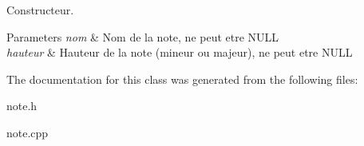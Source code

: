 Constructeur. 


\begin{DoxyParams}{Parameters}
{\em nom} & Nom de la note, ne peut etre N\-U\-L\-L \\
\hline
{\em hauteur} & Hauteur de la note (mineur ou majeur), ne peut etre N\-U\-L\-L \\
\hline
\end{DoxyParams}


The documentation for this class was generated from the following files\-:\begin{DoxyCompactItemize}
\item 
note.\-h\item 
note.\-cpp\end{DoxyCompactItemize}
